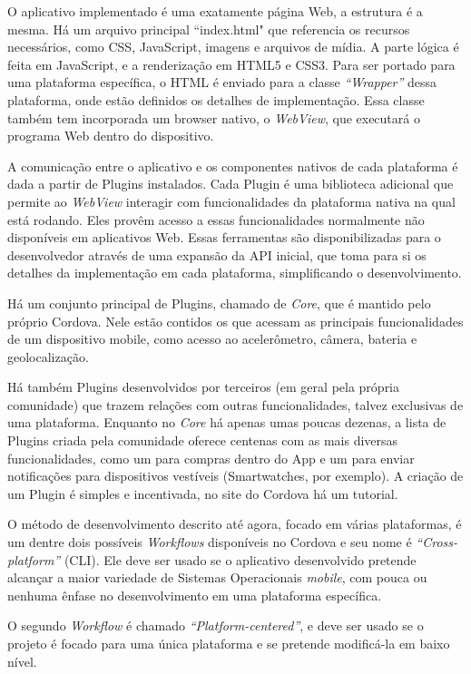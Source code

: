 \documentclass[a4paper,12pt]{article}
\begin{document}
O aplicativo implementado é uma exatamente página Web, a estrutura é a mesma. Há um arquivo principal “index.html" que referencia os recursos necessários, como CSS, JavaScript, imagens e arquivos de mídia. A parte lógica é feita em JavaScript, e a renderização em HTML5 e CSS3. Para ser portado para uma plataforma específica, o HTML é enviado para a classe \emph{“Wrapper”} dessa plataforma, onde estão definidos os detalhes de implementação. Essa classe também tem incorporada um browser nativo, o \emph{WebView}, que executará o programa Web dentro do dispositivo.

A comunicação entre o aplicativo e os componentes nativos de cada plataforma é dada a partir de Plugins instalados. Cada Plugin é uma biblioteca adicional que permite ao \emph{WebView} interagir com funcionalidades da plataforma nativa na qual está rodando. Eles provêm acesso a essas funcionalidades normalmente não disponíveis em aplicativos Web. Essas ferramentas são disponibilizadas para o desenvolvedor através de uma expansão da API inicial, que toma para si os detalhes da implementação em cada plataforma, simplificando o desenvolvimento.

Há um conjunto principal de Plugins, chamado de \emph{Core}, que é mantido pelo próprio Cordova. Nele estão contidos os que acessam as principais funcionalidades de um dispositivo mobile, como acesso ao acelerômetro, câmera, bateria e geolocalização.

Há também Plugins desenvolvidos por terceiros (em geral pela própria comunidade) que trazem relações com outras funcionalidades, talvez exclusivas de uma plataforma. Enquanto no \emph{Core} há apenas umas poucas dezenas, a lista de Plugins criada pela comunidade oferece centenas com as mais diversas funcionalidades, como um para compras dentro do App e um para enviar notificações para dispositivos vestíveis (Smartwatches, por exemplo). A criação de um Plugin é simples e incentivada, no site do Cordova há um tutorial.

O método de desenvolvimento descrito até agora, focado em várias plataformas, é um dentre dois possíveis \emph{Workflows} disponíveis no Cordova e seu nome é \emph{“Cross-platform”} (CLI). Ele deve ser usado se o aplicativo desenvolvido pretende alcançar a maior variedade de Sistemas Operacionais \emph{mobile}, com pouca ou nenhuma ênfase no desenvolvimento em uma plataforma específica.

O segundo \emph{Workflow} é chamado \emph{“Platform-centered”}, e deve ser usado se o projeto é focado para uma única plataforma e se pretende modificá-la em baixo nível.
\end{document}
